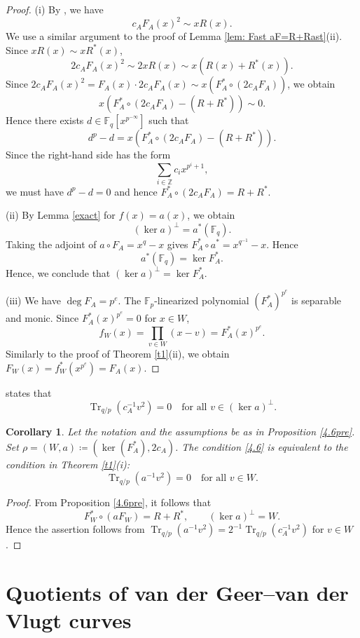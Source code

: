 \documentclass[12pt,a4paper]{amsart}
\newtheorem{corollary}[theorem]{Corollary}
\theoremstyle{definition}
\def\F{{\mathbb F}}
\theoremstyle{remark}
\DeclareMathOperator{\Tr}{Tr}
\begin{document}
\begin{proof}
(i) 
By \cite[(A.8)]{TT}, we have 
\[
c_A F_A(x)^2 \sim x R(x). 
\]
We use a similar argument to the proof of Lemma \ref{lem: Fast aF=R+Rast}(ii). 
Since $x R(x) \sim x R^\ast(x)$, 
\[
2 c_A F_A(x)^2 \sim 2 xR(x) \sim x(R(x)+R^\ast(x)). 
\]
Since $2 c_A F_A(x)^2=F_A(x) \cdot 2c_A F_A(x) \sim x (F_A^\ast \circ (2 c_A F_A))$, we obtain 
\[
x (F_A^\ast \circ (2 c_A F_A)-(R+R^\ast)) \sim 0. 
\]
Hence there exists $d \in \F_q[x^{p^{-\infty}}]$ such that 
\[
d^p-d=x (F_A^\ast \circ (2 c_A F_A)-(R+R^\ast)). 
\]
Since the right-hand side has the form 
\[
\sum_{i \in \mathbb{Z}} c_i x^{p^i+1},   
\]
we must have $d^p-d=0$ and hence 
$F_A^\ast \circ (2 c_A F_A)=R+R^\ast$. 


(ii) 
By Lemma \ref{exact} for $f(x)=a(x)$, we obtain 
\[
(\ker a)^{\perp}=a^\ast(\F_q). 
\]
Taking the adjoint of $a \circ F_A=x^q-x$ gives 
$F_A^\ast \circ a^{\ast}=x^{q^{-1}}-x$.  
Hence 
\[
a^\ast(\F_q)=\ker F_A^{\ast}. 
\]
Hence, we conclude that $(\ker a)^{\perp}=\ker F_A^\ast$. 

(iii) We have $\deg F_A=p^e$. 
The $\F_p$-linearized polynomial 
$(F_A^\ast)^{p^e}$ is separable and monic. 
Since $F_A^\ast(x)^{p^e}=0$ for $x \in W$, 
\[
f_W(x)=\prod_{v \in W}(x-v)=F_A^\ast(x)^{p^e}. 
\]
Similarly to the proof of Theorem \ref{t1}(ii), we obtain $F_W(x)=f_W^\ast(x^{p^e})=F_A(x)$.  
\end{proof}
\cite[Condition 4.6]{ITT} states that 
\begin{equation}\label{4.6}
\Tr_{q/p}(c_A^{-1} v^2)=0 \quad \textrm{for all $v \in (\ker a)^{\perp}$}. 
\end{equation}
\begin{corollary}\label{c4.6}
Let the notation and the assumptions be as in Proposition \ref{4.6pre}. 
Set $\rho=(W,a) \coloneqq (\ker(F_A^\ast), 2c_A)$.
The condition \eqref{4.6} is equivalent to 
the condition in Theorem {\rm \ref{t1}(i)}:  
\[
\Tr_{q/p}(a^{-1} v^2)=0 \quad \textrm{for all $v \in W$}. 
\]
\end{corollary}
\begin{proof}
From Proposition \ref{4.6pre}, it follows that 
\[
F_W^\ast \circ (a F_W)=R+R^{\ast}, \qquad 
(\ker a)^{\perp}=W.
\]
Hence the assertion follows from 
$\Tr_{q/p}(a^{-1} v^2)=2^{-1}\Tr_{q/p}(c_A^{-1} v^2)$ for $v \in W$. 
\end{proof}



\section{Quotients of van der Geer--van der Vlugt curves}\label{appC}
\end{document}
